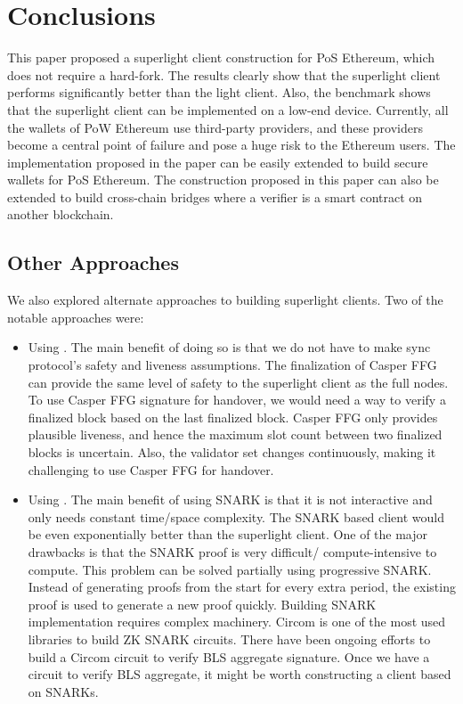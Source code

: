 \documentclass[a4paper,11pt,oneside]{article}
\theoremstyle{definition}
\begin{document}
  \section{Conclusions}
  This paper proposed a superlight client construction for PoS Ethereum, which does not require a hard-fork. The results clearly show that the superlight client performs significantly better than the light client. Also, the benchmark shows that the superlight client can be implemented on a low-end device. Currently, all the wallets of PoW Ethereum use third-party providers, and these providers become a central point of failure and pose a huge risk to the Ethereum users. The implementation proposed in the paper can be easily extended to build secure wallets for PoS Ethereum. The construction proposed in this paper can also be extended to build cross-chain bridges where a verifier is a smart contract on another blockchain\cite{10.1007/978-3-030-43725-1_3}. 

  \subsection{Other Approaches}
  We also explored alternate approaches to building superlight clients. Two of the notable approaches were:
  \begin{itemize}
    \item Using . The main benefit of doing so is that we do not have to make sync protocol's safety and liveness assumptions. The finalization of Casper FFG can provide the same level of safety to the superlight client as the full nodes. To use Casper FFG signature for handover, we would need a way to verify a finalized block based on the last finalized block. Casper FFG only provides plausible liveness, and hence the maximum slot count between two finalized blocks is uncertain. Also, the validator set changes continuously, making it challenging to use Casper FFG for handover.

    \item Using . The main benefit of using SNARK is that it is not interactive and only needs constant time/space complexity. The SNARK based client would be even exponentially better than the superlight client. One of the major drawbacks is that the SNARK proof is very difficult/ compute-intensive to compute. This problem can be solved partially using progressive SNARK. Instead of generating proofs from the start for every extra period, the existing proof is used to generate a new proof quickly. Building SNARK implementation requires complex machinery. Circom is one of the most used libraries to build ZK SNARK circuits. There have been ongoing efforts to build a Circom circuit to verify BLS aggregate signature. Once we have a circuit to verify BLS aggregate, it might be worth constructing a client based on SNARKs. 
  \end{itemize}
\end{document}
